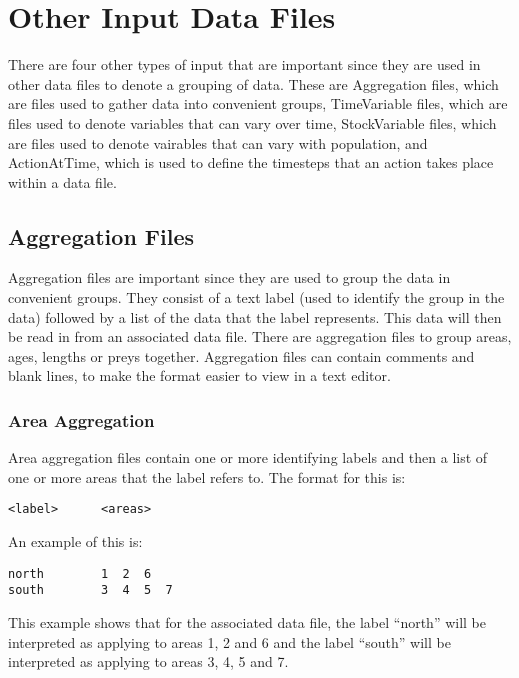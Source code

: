 \documentclass[]{book}
\begin{document}
\hypertarget{sec:otherinputfile}{%
\section{Other Input Data Files}\label{sec:otherinputfile}}

There are four other types of input that are important since they are
used in other data files to denote a grouping of data. These are
Aggregation files, which are files used to gather data into convenient
groups, TimeVariable files, which are files used to denote variables
that can vary over time, StockVariable files, which are files used to
denote vairables that can vary with population, and ActionAtTime, which
is used to define the timesteps that an action takes place within a data
file.

\hypertarget{aggregation-files}{%
\subsection{Aggregation Files}\label{aggregation-files}}

Aggregation files are important since they are used to group the data in
convenient groups. They consist of a text label (used to identify the
group in the data) followed by a list of the data that the label
represents. This data will then be read in from an associated data file.
There are aggregation files to group areas, ages, lengths or preys
together. Aggregation files can contain comments and blank lines, to
make the format easier to view in a text editor.

\hypertarget{subsec:areaagg}{%
\subsubsection{Area Aggregation}\label{subsec:areaagg}}

Area aggregation files contain one or more identifying labels and then a
list of one or more areas that the label refers to. The format for this
is:

\begin{verbatim}
<label>      <areas>
\end{verbatim}

An example of this is:

\begin{verbatim}
north        1  2  6
south        3  4  5  7
\end{verbatim}

This example shows that for the associated data file, the label ``north''
will be interpreted as applying to areas 1, 2 and 6 and the label
``south'' will be interpreted as applying to areas 3, 4, 5 and 7.
\end{document}

